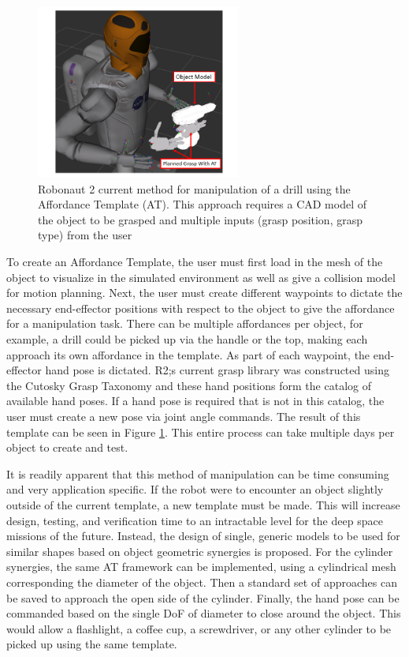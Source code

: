 \documentclass[runningheads,a4paper]{llncs}
\begin{document}
   \begin{figure}[t]
      \centering
      \includegraphics[width=0.6\textwidth]{drill_at2}
      \caption{Robonaut 2 current method for manipulation of a drill using the Affordance Template (AT).  This approach requires a CAD model of the object to be grasped and multiple inputs (grasp position, grasp type) from the user}
      \label{at_example}
   \end{figure}

To create an Affordance Template, the user must first load in the mesh of the object to visualize in the simulated environment as well as give a collision model for motion planning. Next, the user must create different waypoints to dictate the necessary end-effector positions with respect to the object to give the affordance for a manipulation task. There can be multiple affordances per object, for example, a drill could be picked up via the handle or the top, making each approach its own affordance in the template. As part of each waypoint, the end-effector hand pose is dictated. R2;s current grasp library was constructed using the Cutosky Grasp Taxonomy \cite{Cutkosky} and these hand positions form the catalog of available hand poses. If a hand pose is required that is not in this catalog, the user must create a new pose via joint angle commands. The result of this template can be seen in Figure \ref{at_example}. This entire process can take multiple days per object to create and test.

It is readily apparent that this method of manipulation can be time consuming and very application specific. If the robot were to encounter an object slightly outside of the current template, a new template must be made. This will increase design, testing, and verification time to an intractable level for the deep space missions of the future. Instead, the design of single, generic models to be used for similar shapes based on object geometric synergies is proposed. For the cylinder synergies, the same AT framework can be implemented, using a cylindrical mesh corresponding the diameter of the object. Then a standard set of approaches can be saved to approach the open side of the cylinder. Finally, the hand pose can be commanded based on the single DoF of diameter to close around the object. This would allow a flashlight, a coffee cup, a screwdriver, or any other cylinder to be picked up using the same template.
\end{document}
